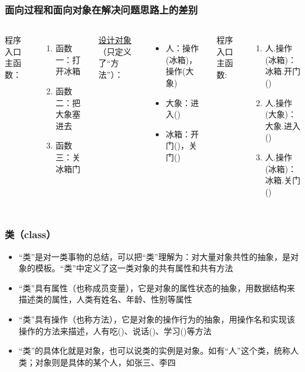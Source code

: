\begin{frame}[t]
  \frametitle{面向过程和面向对象在解决问题思路上的差别}
  \vspace{1pt}
  \begin{columns}[t]
      
      \vspace{1pt}
      程序入口主函数：
      \begin{enumerate}
        \item 函数一：打开冰箱
        \item 函数二：把大象塞进去
        \item 函数三：关冰箱门
      \end{enumerate}
      
      \vspace{1pt}
      \underline{设计对象}（只定义了“方法”）：
      \begin{itemize}
        \item 人：操作(冰箱)，操作(大象)
        \item 大象：进入()
        \item 冰箱：开门()，关门()
      \end{itemize}
       程序入口主函数:
       \begin{enumerate}
         \item 人.操作(冰箱)：冰箱.开门()
         \item 人.操作(大象)：大象.进入()
         \item 人.操作(冰箱)：冰箱.关门()
       \end{enumerate}
  \end{columns}
\end{frame}

\begin{frame}
  \frametitle{类（class）}
  \begin{itemize}
    \item “类”是对一类事物的总结，可以把“类”理解为：对大量对象共性的抽象，是对象的模板。“类”中定义了这一类对象的共有属性和共有方法
    \item “类”具有属性（也称成员变量），它是对象的属性状态的抽象，用数据结构来描述类的属性，人类有姓名、年龄、性别等属性
    \item “类”具有操作（也称方法），它是对象的操作行为的抽象，用操作名和实现该操作的方法来描述，人有吃()、说话()、学习()等方法
    \item “类”的具体化就是对象，也可以说类的实例是对象。如有“人”这个类，统称人类；对象则是具体的某个人，如张三、李四
  \end{itemize}

\end{frame}

